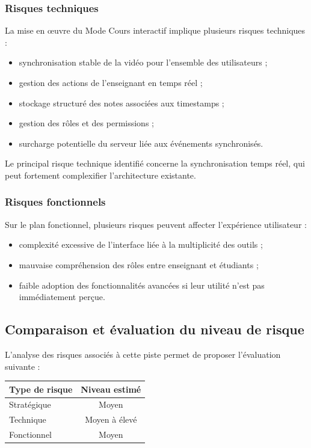 \documentclass[12pt,a4paper]{report}
\begin{document}
\subsubsection{Risques techniques}

La mise en œuvre du Mode Cours interactif implique plusieurs risques techniques :
\begin{itemize}
  \item synchronisation stable de la vidéo pour l’ensemble des utilisateurs ;
  \item gestion des actions de l’enseignant en temps réel ;
  \item stockage structuré des notes associées aux timestamps ;
  \item gestion des rôles et des permissions ;
  \item surcharge potentielle du serveur liée aux événements synchronisés.
\end{itemize}

Le principal risque technique identifié concerne la synchronisation temps réel,
qui peut fortement complexifier l’architecture existante.

\subsubsection{Risques fonctionnels}

Sur le plan fonctionnel, plusieurs risques peuvent affecter l’expérience utilisateur :
\begin{itemize}
  \item complexité excessive de l’interface liée à la multiplicité des outils ;
  \item mauvaise compréhension des rôles entre enseignant et étudiants ;
  \item faible adoption des fonctionnalités avancées si leur utilité n’est pas
  immédiatement perçue.
\end{itemize}

\subsection{Comparaison et évaluation du niveau de risque}

L’analyse des risques associés à cette piste permet de proposer l’évaluation
suivante :

\begin{center}
\begin{tabular}{|l|c|}
\hline
\textbf{Type de risque} & \textbf{Niveau estimé} \\
\hline
Stratégique & Moyen \\
Technique & Moyen à élevé \\
Fonctionnel & Moyen \\
\hline
\end{tabular}
\end{center}
\end{document}
